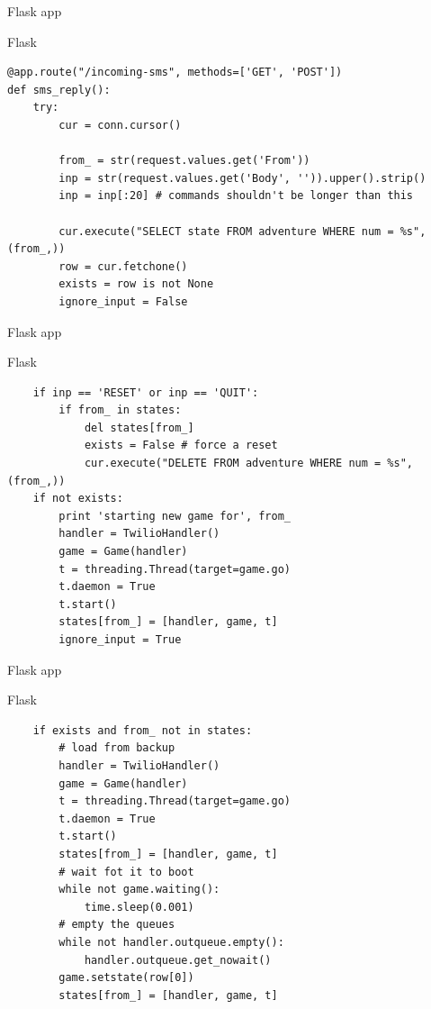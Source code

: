 \documentclass{beamer}
\def\py{
  \lstset{
     language=Python,
     extendedchars=true,
     basicstyle=\footnotesize\ttfamily,
     showstringspaces=false,
     showspaces=false,
     numbersep=9pt,
     tabsize=2,
     breaklines=true,
     showtabs=false,
     captionpos=b
  }
}
\begin{document}
\begin{frame}[fragile]{Flask app}
\begin{block}{Flask}
\py
\begin{lstlisting}
@app.route("/incoming-sms", methods=['GET', 'POST'])
def sms_reply():
    try:
        cur = conn.cursor()

        from_ = str(request.values.get('From'))
        inp = str(request.values.get('Body', '')).upper().strip()
        inp = inp[:20] # commands shouldn't be longer than this

        cur.execute("SELECT state FROM adventure WHERE num = %s", (from_,))
        row = cur.fetchone()
        exists = row is not None
        ignore_input = False
\end{lstlisting}
\end{block}
\end{frame}
\begin{frame}[fragile]{Flask app}
\begin{block}{Flask}
\py
\begin{lstlisting}
    if inp == 'RESET' or inp == 'QUIT':
        if from_ in states:
            del states[from_]
            exists = False # force a reset
            cur.execute("DELETE FROM adventure WHERE num = %s", (from_,))
    if not exists:
        print 'starting new game for', from_
        handler = TwilioHandler()
        game = Game(handler)
        t = threading.Thread(target=game.go)
        t.daemon = True
        t.start()
        states[from_] = [handler, game, t]
        ignore_input = True
\end{lstlisting}
\end{block}
\end{frame}
\begin{frame}[fragile]{Flask app}
\begin{block}{Flask}
\py
\begin{lstlisting}
    if exists and from_ not in states:
        # load from backup
        handler = TwilioHandler()
        game = Game(handler)
        t = threading.Thread(target=game.go)
        t.daemon = True
        t.start()
        states[from_] = [handler, game, t]
        # wait fot it to boot
        while not game.waiting():
            time.sleep(0.001)
        # empty the queues
        while not handler.outqueue.empty():
            handler.outqueue.get_nowait()
        game.setstate(row[0])
        states[from_] = [handler, game, t]

\end{lstlisting}
\end{block}
\end{frame}
\end{document}
